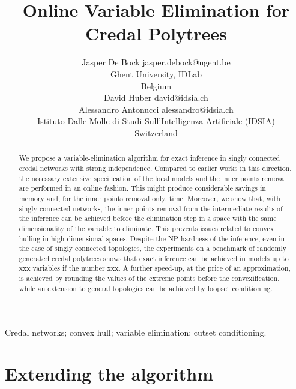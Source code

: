 \documentclass[twoside,11pt]{article}
\begin{document}
\title{Online Variable Elimination for Credal Polytrees}
\author{\name Jasper De Bock \email jasper.debock@ugent.be\\
\addr Ghent University, IDLab\\
Belgium\\
\AND
\name David Huber \email david@idsia.ch\\
\name Alessandro Antonucci \email alessandro@idsia.ch\\
\addr Istituto Dalle Molle di Studi Sull'Intelligenza Artificiale (IDSIA)\\
Switzerland}
\maketitle
\begin{abstract}%
We propose a variable-elimination algorithm for exact inference in singly connected credal networks with strong independence. Compared to earlier works in this direction, the necessary extensive specification of the local models and the inner points removal are performed in an online fashion. This might produce considerable savings in memory and, for the inner points removal only, time. Moreover, we show that, with singly connected networks, the inner points removal from the intermediate results of the inference can be achieved before the elimination step in a space with the same dimensionality of the variable to eliminate. This prevents issues related to convex hulling in high dimensional spaces. Despite the NP-hardness of the inference, even in the case of singly connected topologies, the experiments on a benchmark of randomly generated credal polytrees shows that exact inference can be achieved in models up to xxx variables if the number xxx. A further speed-up, at the price of an approximation, is achieved by rounding the values of the extreme points before the convexification, while an extension to general topologies can be achieved by loopset conditioning.
\end{abstract}
\begin{keywords}
Credal networks; convex hull; variable elimination; cutset conditioning.
\end{keywords}





%
\section{Extending the algorithm}
\end{document}
